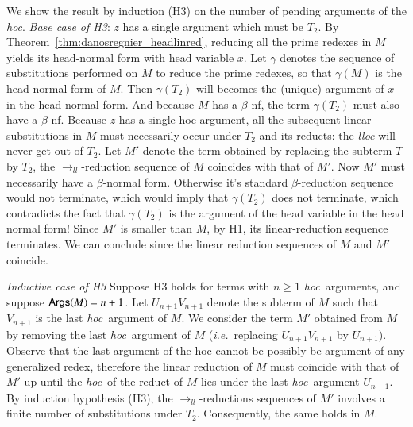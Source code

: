\documentclass{elsarticle}
\makeatletter
\theoremstyle{plain}
\theoremstyle{definition}
\renewcommand\ie{{\it i.e.\@\xspace}}
\newcommand{\llred}{\rightarrow_{ll}}
\newcommand{\hoc}{\emph{hoc}}
\makeatother
\begin{document}
    We show the result by induction (H3) on the number of pending arguments of the \emph{hoc}.
    \emph{Base case of H3}: $z$ has a single argument which must be $T_2$.
    By Theorem~\ref{thm:danosregnier_headlinred}, reducing all the prime redexes in $M$ yields its head-normal form
    with head variable $x$.
    Let $\gamma$ denotes the sequence of substitutions performed on $M$ to reduce the prime redexes, so that $\gamma(M)$ is the head normal form of $M$.  Then $\gamma(T_2)$ will becomes the (unique) argument of $x$ in the head normal form. And because $M$ has a $\beta$-nf, the term $\gamma(T_2)$ must also have a $\beta$-nf.
    Because $z$ has a single hoc argument, all the subsequent linear substitutions in $M$ must necessarily occur under $T_2$ and its reducts: the \emph{lloc} will never get out of $T_2$.
    Let $M'$ denote the term obtained by replacing
    the subterm $T$ by $T_2$, the $\llred$-reduction sequence of $M$ coincides with that of $M'$.
    Now $M'$ must necessarily have a $\beta$-normal form. Otherwise it's standard $\beta$-reduction sequence would not terminate, which would imply that $\gamma(T_2)$ does not terminate, which contradicts the fact that $\gamma(T_2)$ is the argument of the head variable in the head normal form!
    Since $M'$ is smaller than $M$, by H1, its linear-reduction sequence terminates. We can conclude since the linear reduction sequences of $M$ and $M'$ coincide.

     \emph{Inductive case of H3} Suppose H3  holds for terms with $n \geq 1$ \hoc\ arguments, and suppose ${\sf Args}(M) = n+1$.
    Let $U_{n+1} V_{n+1}$ denote the subterm of $M$ such that $V_{n+1}$ is the last \hoc\ argument of $M$. We consider the term $M'$ obtained from $M$ by removing the last \hoc\ argument of $M$ (\ie~replacing $U_{n+1} V_{n+1}$ by $U_{n+1}$).
    Observe that the last argument of the hoc cannot be possibly be argument of any generalized redex, therefore the linear reduction of $M$ must  coincide with that of $M'$ up until the \hoc\ of the reduct of $M$ lies under the last \hoc\ argument $U_{n+1}$.
%
    By induction hypothesis (H3), the $\llred$-reductions sequences of $M'$ involves a finite number of substitutions under $T_2$. Consequently, the same holds in $M$.
\end{document}
